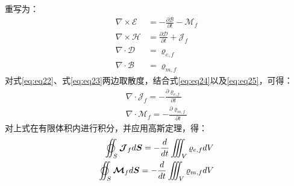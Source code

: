 \documentclass{article}
\numberwithin{equation}{section}
\renewcommand{\vec}[1]{\boldsymbol{#1}}
\begin{document}
\textbf{\color{blue}{麦克斯韦方程组的微分形式}}重写为：
\begin{align}
    \label{eq:eq22}
    \nabla \times \vec{\mathcal{E}}&=-\frac{\partial \vec{\mathcal{B}}}{\partial t}-\vec{\mathcal{M}}_f \\
    \label{eq:eq23}
    \nabla \times \vec{\mathcal{H}}&=\frac{\partial \vec{\mathcal{D}}}{\partial t}+\vec{\mathcal{J}}_{f} \\
    \label{eq:eq24}
    \nabla \cdot \vec{\mathcal{D}}&=\varrho _{e,f} \\
    \label{eq:eq25}
    \nabla \cdot \vec{\mathcal{B}}&=\varrho _{m,f}
\end{align}
对式\ref{eq:eq22}、式\ref{eq:eq23}两边取散度，结合式\ref{eq:eq24}以及\ref{eq:eq25}，可得\textbf{\color{blue}{电流连续性方程的微分形式}}：
\begin{align}
    \nabla \cdot \vec{\mathcal{J}}_{f}=-\frac{\partial \varrho _{e,f}}{\partial t} \\
    \nabla \cdot \vec{\mathcal{M}}_{f}=-\frac{\partial \varrho _{m,f}}{\partial t}
\end{align}
对上式在有限体积内进行积分，并应用高斯定理，得\textbf{\color{blue}{电流连续性方程的积分形式}}：
\begin{align}
    \varoiint_S \vec{\mathcal{J}}_{f} d\vec{S}=-\frac{d}{dt}\iiint_V \varrho _{e,f} dV \\
    \varoiint_S \vec{\mathcal{M}}_{f} d\vec{S}=-\frac{d}{dt}\iiint_V \varrho _{m,f} dV
\end{align}
\end{document}
